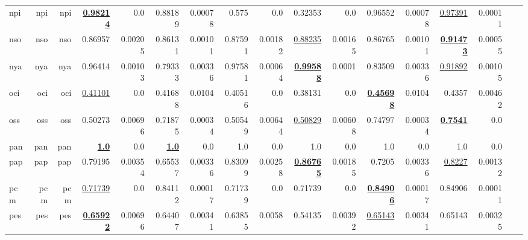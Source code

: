 \documentclass[11pt]{article}
\begin{document}
\begin{table*}[h]
{\begin{tabular}{lrrrrrrrrrrrrrrrr}
npi         & npi         & npi         & \textbf{\underline{0.98214}}         & 0.0         & 0.88189         & 0.00078         & 0.575         & 0.0         & 0.32353         & 0.0         & 0.96552         & 0.00078         & \underline{0.97391}         & 0.00011         \\
nso         & nso         & nso         & 0.86957         & 0.00205         & 0.86131         & 0.00101         & 0.87591         & 0.00182         & \underline{0.88235}         & 0.00165         & 0.86765         & 0.00101         & \textbf{\underline{0.91473}}         & 0.00055         \\
nya         & nya         & nya         & 0.96414         & 0.00103         & 0.79333         & 0.00336         & 0.97581         & 0.00064         & \textbf{\underline{0.99588}}         & 0.0001         & 0.83509         & 0.00336         & \underline{0.91892}         & 0.00105         \\
oci         & oci         & oci         & \underline{0.41101}         & 0.0         & 0.41688         & 0.0104         & 0.40516         & 0.0         & 0.38131         & 0.0         & \textbf{\underline{0.45698}}         & 0.0104         & 0.4357         & 0.00462         \\
oss         & oss         & oss         & 0.50273         & 0.00696         & 0.71875         & 0.00034         & 0.50549         & 0.00644         & \underline{0.50829}         & 0.00608         & 0.74797         & 0.00034         & \textbf{\underline{0.7541}}         & 0.0         \\
pan         & pan         & pan         & \textbf{\underline{1.0}}         & 0.0         & \textbf{\underline{1.0}}         & 0.0         & 1.0         & 0.0         & 1.0         & 0.0         & 1.0         & 0.0         & 1.0         & 0.0         \\
pap         & pap         & pap         & 0.79195         & 0.00354         & 0.65537         & 0.00336         & 0.83099         & 0.00258         & \textbf{\underline{0.86765}}         & 0.00185         & 0.7205         & 0.00336         & \underline{0.8227}         & 0.00132         \\
pcm         & pcm         & pcm         & \underline{0.71739}         & 0.0         & 0.84112         & 0.00017         & 0.71739         & 0.0         & 0.71739         & 0.0         & \textbf{\underline{0.84906}}         & 0.00017         & 0.84906         & 0.00011         \\
pes         & pes         & pes         & \textbf{\underline{0.65922}}         & 0.00696         & 0.64407         & 0.00341         & 0.63855         & 0.0058         & 0.54135         & 0.00392         & \underline{0.65143}         & 0.00341         & 0.65143         & 0.00325         \\

\end{tabular}}
\end{table*}
\end{document}
